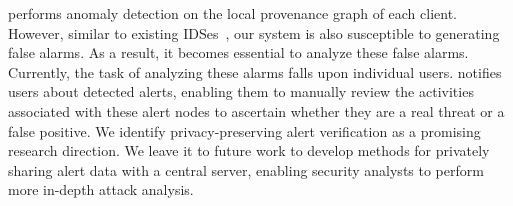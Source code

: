  \Sys performs anomaly detection on the local provenance graph of each client. However, similar to existing IDSes~\cite{flash2024,cheng2023kairos,wang2022threatrace}, our system is also susceptible to generating false alarms. As a result, it becomes essential to analyze these false alarms. Currently, the task of analyzing these alarms falls upon individual users. \Sys notifies users about detected alerts, enabling them to manually review the activities associated with these alert nodes to ascertain whether they are a real threat or a false positive. We identify privacy-preserving alert verification as a promising research direction. We leave it to future work to develop methods for privately sharing alert data with a central server, enabling security analysts to perform more in-depth attack analysis.


